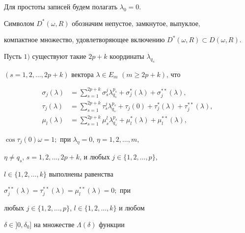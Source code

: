  


Для простоты записей будем полагать $\lambda_0=0$. 


 


Символом $D^*(\omega,R)$ обозначим непустое, замкнутое, выпуклое, 


компактное множество, удовлетворяющее включению $D^*(\omega,R)\subset 


D(\omega,R)$. 


 


\begin{thm} 


Пусть $1)$ существуют такие $2p+k$ координаты $\lambda_{q_s}$ 


$(s=1,2,\dotsc,2p+k)$ вектора $\lambda\in E_m$ $(m\ge 2p+k)$, что 


\begin{equation} 


\begin{split} 


\sigma_j(\lambda)&=\sum^{2p+k}_{s=1}\sigma^j_s 


\lambda^{p_s}_{q_s}+\sigma^*_j(\lambda)+ 


\sigma^{**}_j(\lambda), \\ 


\tau_j(\lambda)&=\sum^{2p+k}_{s=1}\tau^j_s 


\lambda^{p_s}_{q_s}+\tau_j(0)+ 


\tau^*_j(\lambda)+\tau^{**}_j(\lambda),\\ 


\mu_l(\lambda)&=\sum^{2p+k}_{s=1}\mu^l_s 


\lambda^{p_s}_{q_s}+\mu^*_l(\lambda)+\mu^{**}_l(\lambda), 


\end{split} 


\end{equation} 


$\cos\tau_j(0)\omega=1;$ при $\lambda_\eta=0$, $\eta=1,2,\dotsc,m$, 


$\eta\ne q_s$, $s=1,2,\dotsc,2p+k$, и любых $j\in\{1,2,\dotsc,p\}$, 


$l\in\{1,2,\dotsc,k\}$ выполнены равенства 


$\sigma^{**}_j(\lambda)=\tau^{**}_j(\lambda)=\mu^{**}_l(\lambda)=0;$ при 


любых $j\in\{1,2,\dotsc,p\}$, $l\in\{1,2,\dotsc,k\}$ и любом 


$\delta\in]0,\delta_0]$ на множестве $\Lambda(\delta)$ функции 



\end{thm}
